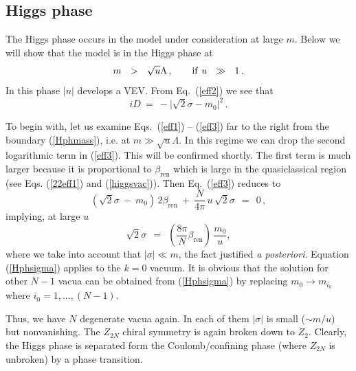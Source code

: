 \documentclass[epsfig,12pt]{article}
\def\beq{\begin{equation}}
\def\eeq{\end{equation}}
\def\beq{\begin{equation}}
\def\eeq{\end{equation}}
\newcommand{\bren}{{\beta_\text{ren}}}
\begin{document}
{\subsection{ Higgs phase}
\label{subshiggph}

The Higgs phase occurs in the model 
under consideration at large $m$. Below we will show that the model is in the Higgs phase at
\beq
m ~~>~~ \sqrt{u}\Lambda\,,\qquad {\rm if} \,\,u~~\gg~~ 1\,.
\label{Hphmass}
\eeq
In this phase $|n|$ develops a VEV. From Eq.~(\ref{eff2}) we see that
\beq
iD ~=~ -\bigl|\sqrt{2}\sigma -m_0\bigr|^2\, .
\label{HphD}
\eeq

To begin with, let us examine  Eqs.~(\ref{eff1}) -- (\ref{eff3}) 
far to the right from the boundary (\ref{Hphmass}), i.e. 
at $m\gg \sqrt{u}\Lambda$. 
In this regime we can drop the second logarithmic term in (\ref{eff3}).
This will be confirmed shortly.
 The first
term is much larger because it is   proportional to $\bren$ which is large in the quasiclassical region
(see Eqs. (\ref{22eff1}) and  (\ref{higgsvac})). Then Eq.~(\ref{eff3}) reduces to
\beq
(\sqrt{2}\sigma ~-~m_0)\,2\bren ~+~ \frac{N}{4\pi}\,u\,\sqrt{2}\sigma ~~=~~0 \,,
\eeq
implying, at large $u$  
\beq
\sqrt{2}\sigma ~~=~~ \left(\frac{8\pi}{N}\bren\right)\,\frac{m_{{0}}}{u},
\label{Hphsigma}
\eeq
where we take into account 
 that $|\sigma |\ll m$, the fact justified {\em a posteriori}. Equation (\ref{Hphsigma}) applies to the 
 $k=0$ vacuum. It is obvious that the solution for other $N-1$ vacua can be obtained
 from (\ref{Hphsigma})  by replacing $m_0\to m_{i_0}$ where $i_0=1,...,(N-1)$.

Thus, we have $N$ degenerate vacua again. In each of them $|\sigma |$ is small ($\sim m/u$) but
nonvanishing. The $Z_{2N}$ chiral symmetry is again broken down to $Z_2$. Clearly, the 
Higgs phase is separated form the Coulomb/confining phase (where $Z_{2N}$ is unbroken) by
a phase transition. 

}
\end{document}
